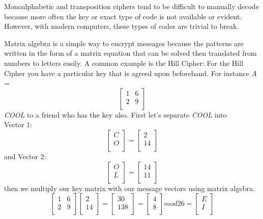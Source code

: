 \documentclass[12pt,letterpaper]{article} %
\begin{document}
Monoalphabetic and transposition ciphers tend to be difficult to manually decode because more often the key or exact type of code is not available or evident. However, with modern computers, these types of codes are trivial to break.
\par
Matrix algebra is a simple way to encrypt messages because the patterns are written in the form of a matrix equation that can be solved then translated from numbers to letters 
easily.  A common example is the Hill Cipher: For the Hill Cipher you have a particular key that is agreed upon beforehand.  For instance $A$ =
\[\begin{bmatrix}
1&6\\
2&9\\
\end{bmatrix}\]
  \emph{COOL} to a friend who has the key also. First let’s separate \emph{COOL} into \\
Vector 1:
 \[\begin{bmatrix}
C\\
O\\
\end{bmatrix}
=
\begin{bmatrix}
2\\
14\\
\end{bmatrix}\]
and  
Vector 2:
\[\begin{bmatrix}
O\\
L\\
\end{bmatrix}
=
\begin{bmatrix}
14\\
11\\
\end{bmatrix}\]
then we multiply our key matrix with our message vectors using matrix algebra. 
\[\begin{bmatrix}
1&6\\
2&9\\
\end{bmatrix}
\begin{bmatrix}
2\\
14\\
\end{bmatrix}
=
\begin{bmatrix}
30\\
138\\
\end{bmatrix}
=
\begin{bmatrix}
4\\
8\\
\end{bmatrix}
mod26
=
\begin{bmatrix}
E\\
I\\
\end{bmatrix}\]
\end{document}
